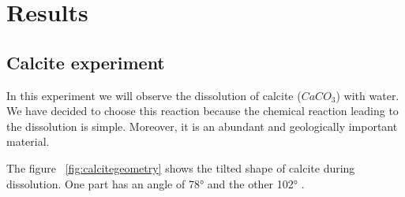 \chapter{Results}
\label{chap:results}


\section{Calcite experiment}

In this experiment we will observe the dissolution of calcite ($CaCO_3$) with water. We have decided to choose this reaction because the chemical reaction leading to the dissolution is simple. Moreover, it is an abundant and geologically important material.\cite{hillner1992atomic}\cite{liang1996dissolution} \cite{paquette1995relationship}

The figure ~\ref{fig:calcitegeometry} shows the tilted shape of calcite during dissolution. One part has an angle of 78° and the other 102°\cite{shiraki2000dissolution} \cite{Morse200251}.

